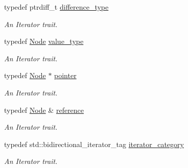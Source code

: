 \begin{DoxyCompactItemize}
\item 
\hypertarget{classphys_1_1xml_1_1NodeIterator_a0d7f40ce76602a5cc74616545d5c6076}{
typedef ptrdiff\_\-t \hyperlink{classphys_1_1xml_1_1NodeIterator_a0d7f40ce76602a5cc74616545d5c6076}{difference\_\-type}}
\label{classphys_1_1xml_1_1NodeIterator_a0d7f40ce76602a5cc74616545d5c6076}

\begin{DoxyCompactList}\small\item\em An Iterator trait. \item\end{DoxyCompactList}\item 
\hypertarget{classphys_1_1xml_1_1NodeIterator_a41a1bf31ea149a9a58d60c52e24234ab}{
typedef \hyperlink{classphys_1_1xml_1_1Node}{Node} \hyperlink{classphys_1_1xml_1_1NodeIterator_a41a1bf31ea149a9a58d60c52e24234ab}{value\_\-type}}
\label{classphys_1_1xml_1_1NodeIterator_a41a1bf31ea149a9a58d60c52e24234ab}

\begin{DoxyCompactList}\small\item\em An Iterator trait. \item\end{DoxyCompactList}\item 
\hypertarget{classphys_1_1xml_1_1NodeIterator_ad50b430887341d1cad3a655f5363c2e2}{
typedef \hyperlink{classphys_1_1xml_1_1Node}{Node} $\ast$ \hyperlink{classphys_1_1xml_1_1NodeIterator_ad50b430887341d1cad3a655f5363c2e2}{pointer}}
\label{classphys_1_1xml_1_1NodeIterator_ad50b430887341d1cad3a655f5363c2e2}

\begin{DoxyCompactList}\small\item\em An Iterator trait. \item\end{DoxyCompactList}\item 
\hypertarget{classphys_1_1xml_1_1NodeIterator_a7e9f8c536d367f3d9af80ee0b749e36f}{
typedef \hyperlink{classphys_1_1xml_1_1Node}{Node} \& \hyperlink{classphys_1_1xml_1_1NodeIterator_a7e9f8c536d367f3d9af80ee0b749e36f}{reference}}
\label{classphys_1_1xml_1_1NodeIterator_a7e9f8c536d367f3d9af80ee0b749e36f}

\begin{DoxyCompactList}\small\item\em An Iterator trait. \item\end{DoxyCompactList}\item 
\hypertarget{classphys_1_1xml_1_1NodeIterator_abf077d34ecc13ff336f87a18a6d0fa09}{
typedef std::bidirectional\_\-iterator\_\-tag \hyperlink{classphys_1_1xml_1_1NodeIterator_abf077d34ecc13ff336f87a18a6d0fa09}{iterator\_\-category}}
\label{classphys_1_1xml_1_1NodeIterator_abf077d34ecc13ff336f87a18a6d0fa09}

\begin{DoxyCompactList}\small\item\em An Iterator trait. \item\end{DoxyCompactList}\end{DoxyCompactItemize}
